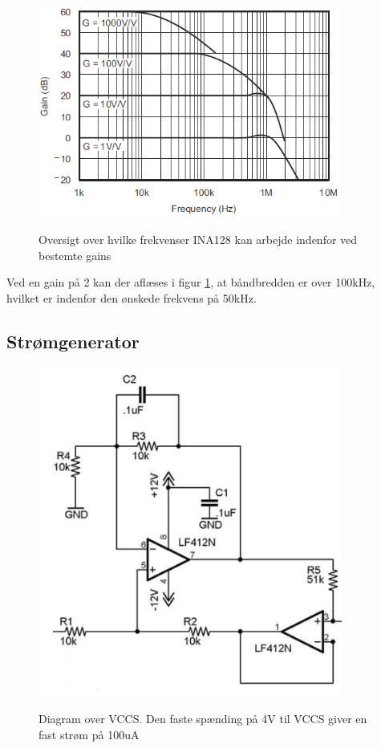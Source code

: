 \begin{figure}[H]
\centering
{\includegraphics[width=10cm]
{Figure/ina128gain}}
\caption{Oversigt over hvilke frekvenser INA128 kan arbejde indenfor ved bestemte gains}
\label{fig:ina128gain}
\end{figure}

Ved en gain på 2 kan der aflæses i figur \ref{fig:ina128gain}, at båndbredden er over 100kHz, hvilket er indenfor den ønskede frekvens på 50kHz. 

\subsection{Strømgenerator}

\begin{figure}[H]
\centering
{\includegraphics[width=10cm]
{Figure/howland1}}
\caption{Diagram over VCCS. Den faste spænding på 4V til VCCS giver en fast strøm på 100uA}
\label{fig:howland1}
\end{figure}

